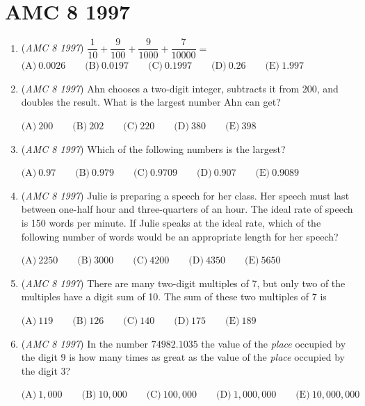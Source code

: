 \section{AMC 8 1997}
        \begin{enumerate}
        	\item (\textit{AMC 8 1997}) $\dfrac{1}{10} + \dfrac{9}{100} + \dfrac{9}{1000} + \dfrac{7}{10000} =$
$\text{(A)}\ 0.0026 \qquad \text{(B)}\ 0.0197 \qquad \text{(C)}\ 0.1997 \qquad \text{(D)}\ 0.26 \qquad \text{(E)}\ 1.997$


	\item (\textit{AMC 8 1997}) Ahn chooses a two-digit integer, subtracts it from 200, and doubles the result.  What is the largest number Ahn can get?


 $\text{(A)}\ 200 \qquad \text{(B)}\ 202 \qquad \text{(C)}\ 220 \qquad \text{(D)}\ 380 \qquad \text{(E)}\ 398$


	\item (\textit{AMC 8 1997}) Which of the following numbers is the largest?


 $\text{(A)}\ 0.97 \qquad \text{(B)}\ 0.979 \qquad \text{(C)}\ 0.9709 \qquad \text{(D)}\ 0.907 \qquad \text{(E)}\ 0.9089$


	\item (\textit{AMC 8 1997}) Julie is preparing a speech for her class.  Her speech must last between one-half hour and three-quarters of an hour.  The ideal rate of speech is 150 words per minute.  If Julie speaks at the ideal rate, which of the following number of words would be an appropriate length for her speech?


 $\text{(A)}\ 2250 \qquad \text{(B)}\ 3000 \qquad \text{(C)}\ 4200 \qquad \text{(D)}\ 4350 \qquad \text{(E)}\ 5650$


	\item (\textit{AMC 8 1997}) There are many two-digit multiples of 7, but only two of the multiples have a digit sum of 10.  The sum of these two multiples of 7 is


 $\text{(A)}\ 119 \qquad \text{(B)}\ 126 \qquad \text{(C)}\ 140 \qquad \text{(D)}\ 175 \qquad \text{(E)}\ 189$


	\item (\textit{AMC 8 1997}) In the number $74982.1035$ the value of the \textit{place} occupied by the digit 9 is how many times as great as the value of the \textit{place} occupied by the digit 3?


 $\text{(A)}\ 1,000 \qquad \text{(B)}\ 10,000 \qquad \text{(C)}\ 100,000 \qquad \text{(D)}\ 1,000,000 \qquad \text{(E)}\ 10,000,000$



\end{enumerate}
